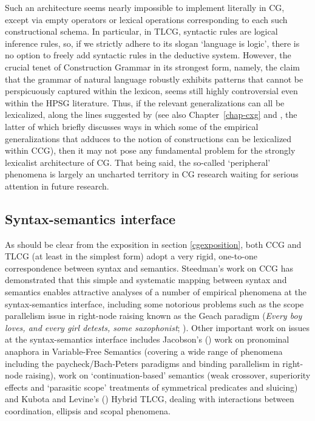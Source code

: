 \documentclass[output=paper]{langsci/langscibook}
\begin{document}
Such an architecture seems nearly impossible to implement literally in
CG, except via empty operators or lexical operations corresponding to
each such constructional schema. In particular, in TLCG, syntactic
rules are logical inference rules, so, if we strictly adhere to its
slogan `language is logic', there is no option to freely add syntactic
rules in the deductive system. However, the crucial tenet of
Construction Grammar in its strongest form, namely, the claim that the
grammar of natural language robustly exhibits patterns that cannot be
perspicuously captured within the lexicon, seems still highly
controversial even within the HPSG literature. Thus, if the relevant
generalizations can all be lexicalized, along the lines suggested by
\citet{MWArgSt} (see also Chapter~\ref{chap-cxg} and
\citet{steedman2011ccg}, the latter of which briefly discusses ways in
which some of the empirical generalizations that \citet{Goldberg95a}
adduces to the notion of constructions can be lexicalized within CCG),
then it may not pose any fundamental problem for the strongly
lexicalist architecture of CG. That being said, the so-called
`peripheral' phenomena is largely an uncharted territory in CG
research waiting for serious attention in future research.


\subsection{Syntax-semantics interface }

As should be clear from the exposition in section \ref{cgexposition},
both CCG and TLCG (at 
least in the simplest form) adopt a very rigid, one-to-one
correspondence between syntax and semantics. Steedman's work on CCG
has demonstrated that 
this simple and systematic mapping between syntax and semantics
enables attractive analyses of
a number of empirical phenomena at the syntax-semantics interface,
including some notorious problems such as the scope parallelism issue
in right-node raising known as
the Geach paradigm (\textit{Every boy loves, and
every girl detests, some saxophonist}; \citet{Geach70a}). Other important work on issues
at the syntax-semantics interface includes Jacobson's
(\citeyear{jacobson1999a,jacobson2000a}) work on pronominal anaphora
in Variable-Free Semantics (covering a wide range of phenomena
including the paycheck/Bach-Peters paradigms and binding parallelism
in right-node raising),  work on `continuation-based'
semantics (weak crossover, superiority effects and `parasitic scope'
treatments of symmetrical predicates and sluicing) and Kubota and
Levine's
(\citeyear{kubota-levine-coord,kubota-levine-pseudo,KubotaLevineBook})
Hybrid TLCG, dealing with interactions between coordination, ellipsis and scopal
phenomena.
\end{document}
